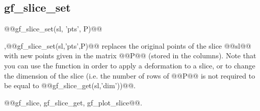 \subsection{gf\_slice_set}
\begin{synopsis}@@gf\_slice\_set(\tslc sl, 'pts', \tmat P)@@\end{synopsis}
\begin{cmddescription}
  \sep{@@gf\_slice\_set(sl,'pts',P)@@} replaces the original points of the
  slice @@sl@@ with new points given in the matrix @@P@@ (stored in
  the columns). Note that you can use the function in order to apply a
  deformation to a slice, or to change the dimension of the slice
  (i.e.  the number of rows of @@P@@ is not required to be equal to
  @@gf_slice_get(sl,'dim'))@@.
\end{cmddescription}
\begin{gfseealso}
  @@gf_slice, gf_slice_get, gf_plot_slice@@.
\end{gfseealso}
\newpage


